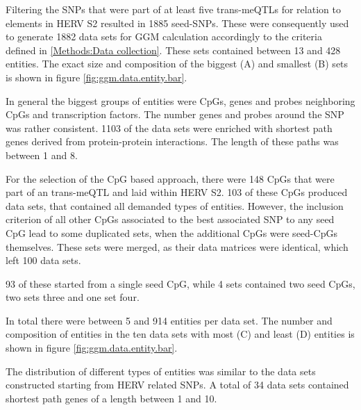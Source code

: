 \documentclass[a4paper,12pt,twoside,openright]{report}
\begin{document}
Filtering the SNPs that were part of at least five trans-meQTLs for relation to elements in HERV S2 resulted in 1885 seed-SNPs. These were consequently used to generate 1882 data sets for GGM calculation accordingly to the criteria defined in \ref{Methods:Data collection}. These sets contained between 13 and 428 entities. The exact size and composition of the biggest (A) and smallest (B) sets is shown in figure \ref{fig:ggm.data.entity.bar}.

In general the biggest groups of entities were CpGs, genes and probes neighboring CpGs and transcription factors. The number genes and probes around the SNP was rather consistent. 1103 of the data sets were enriched with shortest path genes derived from protein-protein interactions. The length of these paths was between 1 and 8. 

For the selection of the CpG based approach, there were 148 CpGs that were part of an trans-meQTL and laid within HERV S2. 103 of these CpGs produced data sets, that contained all demanded types of entities. However, the inclusion criterion of all other CpGs associated to the best associated SNP to any seed CpG lead to some duplicated sets, when the additional CpGs were seed-CpGs themselves. These sets were merged, as their data matrices were identical, which left 100 data sets. 

93 of these started from a single seed CpG, while 4 sets contained two seed CpGs, two sets three and one set four. 

In total there were between 5 and 914 entities per data set. The number and composition of entities in the ten data sets with most (C) and least (D) entities is shown in figure \ref{fig:ggm.data.entity.bar}.

The distribution of different types of entities was similar to the data sets constructed starting from HERV related SNPs. A total of 34 data sets contained shortest path genes of a length between 1 and 10.
\end{document}
